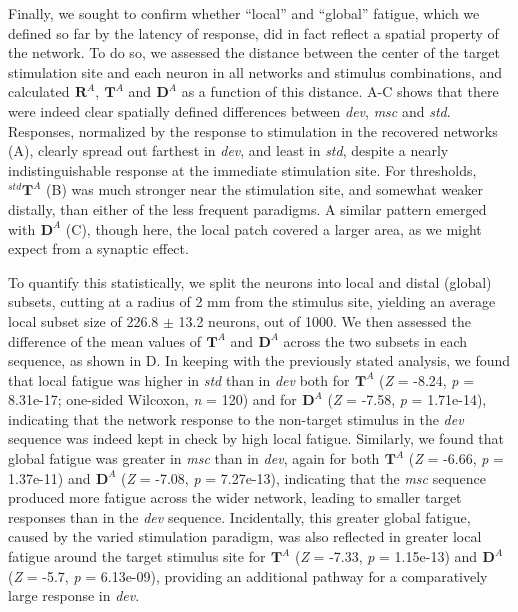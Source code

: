 \documentclass[9pt,lineno,onehalfspacing]{elife}
\newcommand{\dev}{\textit{dev}}
\newcommand{\msc}{\textit{msc}}
\newcommand{\std}{\textit{std}}
\newcommand{\R}[3][]{{}^{#1}_{}\boldsymbol R^{#2}_{#3}}
\newcommand{\T}[3][]{{}^{#1}_{}\boldsymbol T^{#2}_{#3}}
\newcommand{\D}[3][]{{}^{#1}_{}\boldsymbol D^{#2}_{#3}}
\begin{document}
Finally, we sought to confirm whether ``local'' and ``global'' fatigue, which we defined so far by the latency of response, did in fact reflect a spatial property of the network. To do so, we assessed the distance between the center of the target stimulation site and each neuron in all networks and stimulus combinations, and calculated $\R{A}{}$, $\T{A}{}$ and $\D{A}{}$ as a function of this distance. A-C shows that there were indeed clear spatially defined differences between \dev{}, \msc{} and \std{}. Responses, normalized by the response to stimulation in the recovered networks (A), clearly spread out farthest in \dev{}, and least in \std{}, despite a nearly indistinguishable response at the immediate stimulation site. For thresholds, $\T[std]{A}{}$ (B) was much stronger near the stimulation site, and somewhat weaker distally, than either of the less frequent paradigms. A similar pattern emerged with $\D{A}{}$ (C), though here, the local patch covered a larger area, as we might expect from a synaptic effect.

To quantify this statistically, we split the neurons into local and distal (global) subsets, cutting at a radius of 2 mm from the stimulus site, yielding an average local subset size of 226.8 $\pm$ 13.2 neurons, out of 1000. We then assessed the difference of the mean values of $\T{A}{}$ and $\D{A}{}$ across the two subsets in each sequence, as shown in D. In keeping with the previously stated analysis, we found that local fatigue was higher in \std{} than in \dev{} both for $\T{A}{}$ (\textit{Z} = -8.24, \textit{p} = 8.31e-17; one-sided Wilcoxon, \textit{n} = 120) and for $\D{A}{}$ (\textit{Z} = -7.58, \textit{p} = 1.71e-14), indicating that the network response to the non-target stimulus in the \dev{} sequence was indeed kept in check by high local fatigue. Similarly, we found that global fatigue was greater in \msc{} than in \dev{}, again for both $\T{A}{}$ (\textit{Z} = -6.66, \textit{p} = 1.37e-11) and $\D{A}{}$ (\textit{Z} = -7.08, \textit{p} = 7.27e-13), indicating that the \msc{} sequence produced more fatigue across the wider network, leading to smaller target responses than in the \dev{} sequence. Incidentally, this greater global fatigue, caused by the varied stimulation paradigm, was also reflected in greater local fatigue around the target stimulus site for $\T{A}{}$ (\textit{Z} = -7.33, \textit{p} = 1.15e-13) and $\D{A}{}$ (\textit{Z} = -5.7, \textit{p} = 6.13e-09), providing an additional pathway for a comparatively large response in \dev{}.
\end{document}

